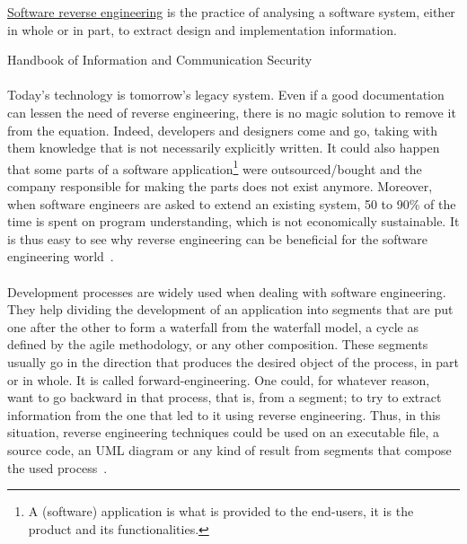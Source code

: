 \begin{framed}
	\begin{definition}
		\underline{Software reverse engineering} is the practice of analysing a software system, either in whole or in part, to extract design and implementation information.
		\begin{flushright}
			\hfill{}{Handbook of Information and Communication Security~\cite{cipresso2010software}}
		\end{flushright}
	\end{definition}
\end{framed}

\paragraph{}
Today's technology is tomorrow's legacy system. Even if a good documentation can lessen the need of reverse engineering, there is no magic solution to remove it from the equation. Indeed, developers and designers come and go, taking with them knowledge that is not necessarily explicitly written. It could also happen that some parts of a software application\footnote{A (software) application is what is provided to the end-users, it is the product and its functionalities.} were outsourced/bought and the company responsible for making the parts does not exist anymore. Moreover, when software engineers are asked to extend an existing system, 50 to 90\% of the time is spent on program understanding, which is not economically sustainable. It is thus easy to see why reverse engineering can be beneficial for the software engineering world~\cite{ali2005teach, cipresso2010software}.

\paragraph{}
Development processes are widely used when dealing with software engineering. They help dividing the development of an application into segments that are put one after the other to form a waterfall from the waterfall model, a cycle as defined by the agile methodology, or any other composition. These segments usually go in the direction that produces the desired object of the process, in part or in whole. It is called forward-engineering. One could, for whatever reason, want to go backward in that process, that is, from a segment; to try to extract information from the one that led to it using reverse engineering. Thus, in this situation, reverse engineering techniques could be used on an executable file, a source code, an UML diagram or any kind of result from segments that compose the used process~\cite{ChikofskyElliotCross}.

